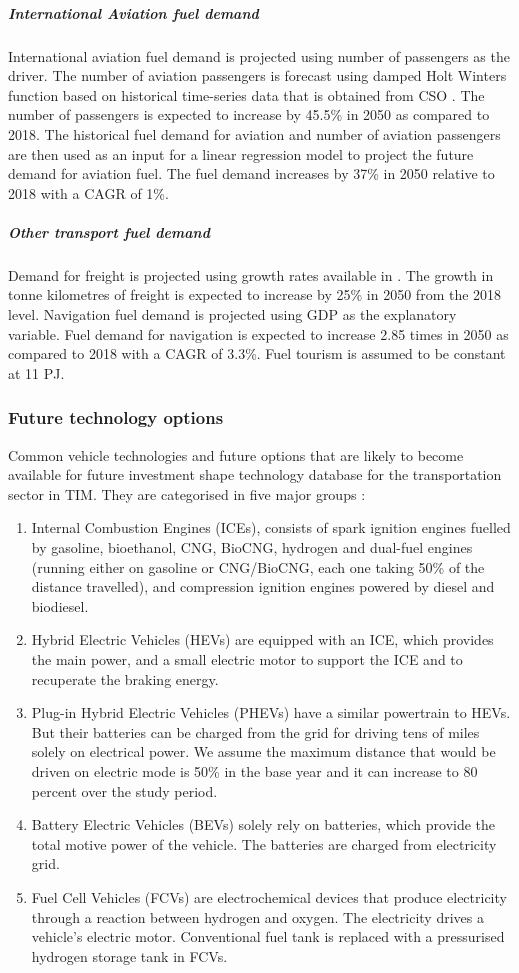\documentclass[journal abbreviation, manuscript]{copernicus}
\begin{document}
\subparagraph{International Aviation fuel demand}
International aviation fuel demand is projected using number of passengers as the driver. The number of aviation passengers is forecast using damped Holt Winters function based on historical time-series data that is obtained from CSO \citep{Dantas2017,Grubb2001}. The number of passengers is expected to increase by 45.5\% in 2050 as compared to 2018. The historical fuel demand for aviation and number of aviation passengers are then used as an input for a linear regression model to project the future demand for aviation fuel. The fuel demand increases by 37\% in 2050 relative to 2018 with a CAGR of 1\%. 

\subparagraph{Other transport fuel demand}
Demand for freight is projected using growth rates available in \citep{yan2020freight}. The growth in tonne kilometres of freight is expected to increase by 25\% in 2050 from the 2018 level. Navigation fuel demand is projected using GDP as the explanatory variable. Fuel demand for navigation is expected to increase 2.85 times in 2050 as compared to 2018 with a CAGR of 3.3\%. Fuel tourism is assumed to be constant at 11 PJ. 

\subsubsection{Future technology options}

Common vehicle technologies and future options that are likely to become available for future investment shape technology database for the transportation sector in TIM. They are categorised in five major groups \citep{Aryanpur2015}:
\begin{enumerate}
 \item Internal Combustion Engines (ICEs), consists of spark ignition engines fuelled by gasoline, bioethanol, CNG, BioCNG, hydrogen and dual-fuel engines (running either on gasoline or CNG/BioCNG, each one taking 50\% of the distance travelled), and compression ignition engines powered by diesel and biodiesel. 
\item Hybrid Electric Vehicles (HEVs) are equipped with an ICE, which provides the main power, and a small electric motor to support the ICE and to recuperate the braking energy. 
\item Plug-in Hybrid Electric Vehicles (PHEVs) have a similar powertrain to HEVs. But their batteries can be charged from the grid for driving tens of miles solely on electrical power. We assume the maximum distance that would be driven on electric mode is 50\% in the base year and it can increase to 80 percent over the study period. 
\item Battery Electric Vehicles (BEVs) solely rely on batteries, which provide the total motive power of the vehicle. The batteries are charged from electricity grid. 
\item Fuel Cell Vehicles (FCVs) are electrochemical devices that produce electricity through a reaction between hydrogen and oxygen. The electricity drives a vehicle’s electric motor. Conventional fuel tank is replaced with a pressurised hydrogen storage tank in FCVs. 
\end{enumerate}
\end{document}
